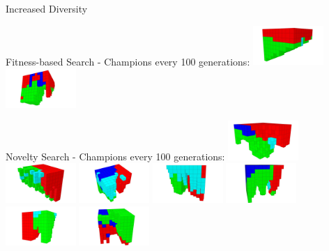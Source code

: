 \documentclass[6pt]{beamer}
\begin{document}
{\begin{frame}{Increased Diversity}
\begin{block}{Fitness-based Search - Champions every 100 generations:}
\includegraphics[width=0.2\textwidth]{../Figures/Robots/f_4_g_900.jpg}
\includegraphics[width=0.2\textwidth]{../Figures/Robots/f_4_g_1000.jpg}
\end{block}

\begin{block}{Novelty Search - Champions every 100 generations:}
\includegraphics[width=0.2\textwidth]{../Figures/Robots/n_4_g_100.jpg}
\includegraphics[width=0.2\textwidth]{../Figures/Robots/n_4_g_200.jpg}
\includegraphics[width=0.2\textwidth]{../Figures/Robots/n_4_g_300.jpg}
\includegraphics[width=0.2\textwidth]{../Figures/Robots/n_4_g_400.jpg}
\includegraphics[width=0.2\textwidth]{../Figures/Robots/n_4_g_500.jpg}\\
\includegraphics[width=0.2\textwidth]{../Figures/Robots/n_4_g_600.jpg}
\includegraphics[width=0.2\textwidth]{../Figures/Robots/n_4_g_700.jpg}

\end{block}
\end{frame}}
\end{document}
